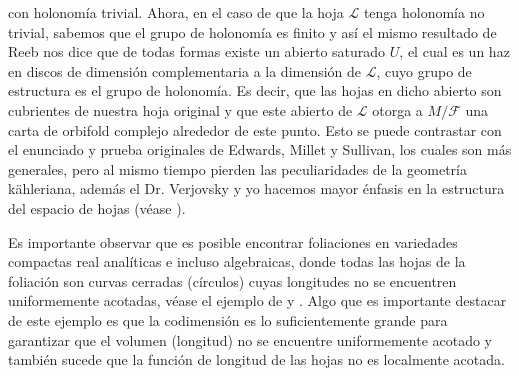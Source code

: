 \documentclass{article}
\begin{document}
con holonom\'ia trivial. Ahora, en el caso de que la hoja $\mathcal{L}$ tenga holonom\'ia no trivial, sabemos que el grupo de holonom\'ia es 
finito y as\'i el mismo resultado de Reeb nos dice que de todas formas existe un abierto saturado $U$, el cual es un haz en 
discos de dimensi\'on complementaria a la dimensi\'on de $\mathcal{L}$, cuyo grupo de estructura es el grupo de holonom\'ia.
Es decir, que las hojas en dicho abierto son cubrientes de nuestra hoja original y que este abierto de $\mathcal{L}$ otorga a $M/\mathcal{F}$ 
una carta de orbifold complejo alrededor de este punto.
Esto se puede contrastar con el enunciado y prueba originales de Edwards, Millet y Sullivan, los cuales son m\'as generales, pero al mismo tiempo pierden 
las peculiaridades de la geometr\'ia k\"ahleriana, adem\'as el Dr. Verjovsky y yo hacemos mayor \'enfasis en la estructura del 
espacio de hojas (v\'ease \cite{EMS}). 

Es importante observar que es posible encontrar foliaciones en variedades compactas real anal\'iticas e incluso algebraicas, donde 
todas las hojas de la foliaci\'on son curvas cerradas (c\'irculos) cuyas longitudes no se encuentren uniformemente acotadas, v\'ease el ejemplo de \cite{E-V} y \cite{Epstein2}.
Algo que es importante destacar de este ejemplo es que la codimensi\'on es lo suficientemente grande 
para garantizar que el volumen (longitud) no se encuentre uniformemente acotado y tambi\'en sucede que la funci\'on de longitud de las hojas 
no es localmente acotada.
\end{document}
